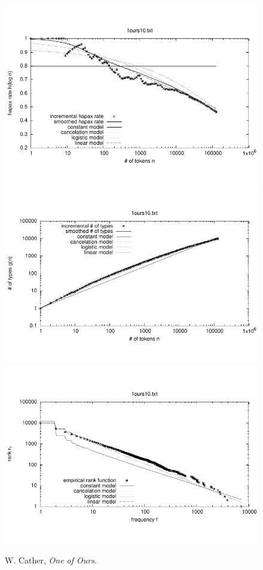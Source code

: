 \documentclass[a4paper,12pt]{article}
\begin{document}

\begin{figure}[p]
  \centering
  \vspace{-2em}
  \includegraphics[width=0.8\columnwidth]{output/herdan/1ours10_27/token_ratio.pdf}
  \\[-3em]
  \includegraphics[width=0.8\columnwidth]{output/herdan/1ours10_27/token_type.pdf}
  \\[-3em]
  \includegraphics[width=0.8\columnwidth]{output/herdan/1ours10_27/frequency_rank.pdf}
  \vspace{-2em}
  \caption{W. Cather, \emph{One of Ours}.\label{fig1ours10F}}
\end{figure}
\end{document}
